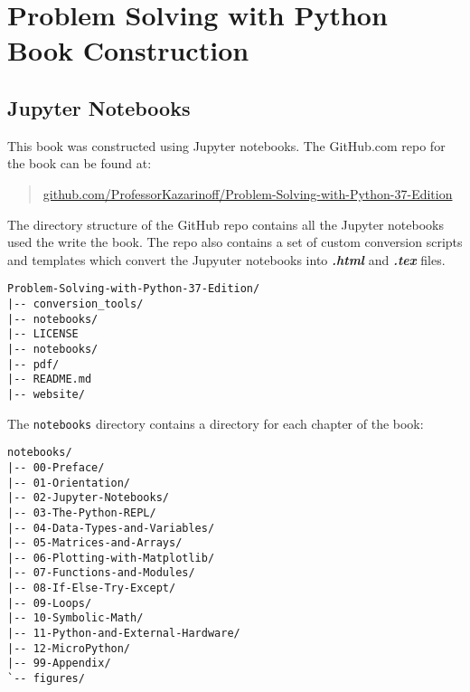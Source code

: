 \documentclass{book}
\newcommand{\passthrough}[1]{#1}
\begin{document}
    
        \hypertarget{problem-solving-with-python-book-construction}{%
\section{Problem Solving with Python Book
Construction}\label{problem-solving-with-python-book-construction}}
    




    
        \hypertarget{jupyter-notebooks}{%
\subsection{Jupyter Notebooks}\label{jupyter-notebooks}}
    




    
        This book was constructed using Jupyter notebooks. The GitHub.com repo
for the book can be found at:

\begin{quote}
\href{https://github.com/ProfessorKazarinoff/Problem-Solving-with-Python-37-Edition}{github.com/ProfessorKazarinoff/Problem-Solving-with-Python-37-Edition}
\end{quote}
    




    
        The directory structure of the GitHub repo contains all the Jupyter
notebooks used the write the book. The repo also contains a set of
custom conversion scripts and templates which convert the Jupyuter
notebooks into \textbf{\emph{.html}} and \textbf{\emph{.tex}} files.
    




    
        \begin{lstlisting}
Problem-Solving-with-Python-37-Edition/
|-- conversion_tools/
|-- notebooks/
|-- LICENSE
|-- notebooks/
|-- pdf/
|-- README.md
|-- website/
\end{lstlisting}
    




    
        The \passthrough{\lstinline!notebooks!} directory contains a directory
for each chapter of the book:
    




    
        \begin{lstlisting}
notebooks/
|-- 00-Preface/
|-- 01-Orientation/
|-- 02-Jupyter-Notebooks/
|-- 03-The-Python-REPL/
|-- 04-Data-Types-and-Variables/
|-- 05-Matrices-and-Arrays/
|-- 06-Plotting-with-Matplotlib/
|-- 07-Functions-and-Modules/
|-- 08-If-Else-Try-Except/
|-- 09-Loops/
|-- 10-Symbolic-Math/
|-- 11-Python-and-External-Hardware/
|-- 12-MicroPython/
|-- 99-Appendix/
`-- figures/
\end{lstlisting}
\end{document}
